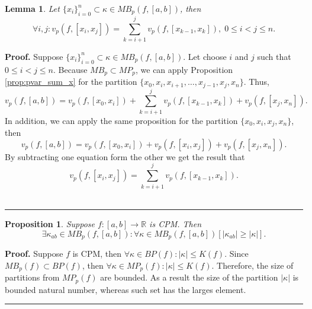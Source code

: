 \documentclass[12pt, a4paper]{article}
\newtheorem{lemma}[theorem]{Lemma}
\newtheorem{proposition}[theorem]{Proposition}
\newenvironment{proof}[1][Proof]{\noindent \textbf{#1.} }{\  \rule{0.5em}{0.5em}}
\numberwithin{equation}{section}
\begin{document}
\begin{lemma}\label{prop:pvarSubset}
  Let $\{x_i\}_{i=0}^{n} \subset \kappa \in MB_{p}(f,[a,b])$, then
  \begin{equation}
    \forall i,j: v_p(f,[x_i,x_j])= \sum_{k=i+1}^j v_p(f,[x_{k-1},x_k]),\; 0 \leq i<j\leq n. 
  \end{equation}
\end{lemma}
\begin{proof}
  Suppose $\{x_i\}_{i=0}^{n} \subset \kappa \in MB_{p}(f,[a,b])$. 
  Let choose $i$ and $j$ such that $0\leq i<j\leq n$.
  Because $MB_{p} \subset MP_{p}$, we can apply Proposition \ref{prop:pvar_sum_x} for the partition
  $\{x_0,x_i,x_{i+1},\dots,x_{j-1},x_j,x_n\}$. Thus,
  \begin{equation}
    v_p(f,[a,b]) = v_p(f,[x_{0},x_i]) + \sum_{k=i+1}^j v_p(f,[x_{k-1},x_k]) + v_p(f,[x_j,x_n]). 
  \end{equation}
  In addition, we can apply the same proposition for the partition $\{x_0,x_i,x_j,x_n\}$, then
  \begin{equation}
    v_p(f,[a,b]) =  v_p(f,[x_{0},x_i]) + v_p(f,[x_i,x_j]) + v_p(f,[x_j,x_n]). 
  \end{equation}
  By subtracting one equation form the other we get the result that
  \begin{equation}
    v_p(f,[x_i,x_j])= \sum_{k=i+1}^j v_p(f,[x_{k-1},x_k]). 
  \end{equation}
\end{proof}


\begin{proposition}\label{prop:EMaxKappa}  
  Suppose $f:[a,b] \rightarrow \mathbb{R}$ is CPM. Then
  \begin{equation}\label{eq:MaxKappa}
    \exists \kappa_{ab} \in MB_{p}(f,[a,b]): \forall \kappa \in MB_{p}(f,[a,b]) [|\kappa_{ab}| \geq |\kappa|].
  \end{equation}  
\end{proposition}
\begin{proof}
  Suppose $f$ is CPM, then $\forall \kappa \in BP(f): |\kappa| \leq K(f)$.
  Since $MB_{p}(f) \subset BP(f)$, then $\forall \kappa \in MP_{p}(f): |\kappa|\leq K(f)$. 
  Therefore, the size of partitions from $MP_{p}(f)$ are bounded.
  As a result the size of the partition $|\kappa|$ is bounded natural number, 
  whereas such set has the larges element.
\end{proof}
\end{document}
